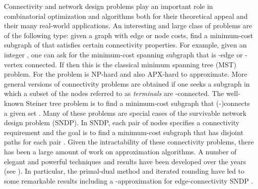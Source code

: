 \documentclass[11pt]{article}
\begin{document}
Connectivity and network design problems play an important role in
combinatorial optimization and algorithms both for their theoretical
appeal and their many real-world applications. An interesting and
large class of problems are of the following type: given a graph
 with edge or node costs, find a minimum-cost subgraph  of
 that satisfies certain connectivity properties. For example, given
an integer , one can ask for the minimum-cost spanning
subgraph that is -edge or -vertex connected. If
 then this is the classical minimum spanning tree (MST)
problem. For  the problem is NP-hard and also APX-hard to
approximate. More general versions of connectivity problems are
obtained if one seeks a subgraph in which a subset of the nodes  referred to as {\em terminals} are -connected.
The well-known Steiner tree problem is to find a minimum-cost subgraph
that (-)connects a given set . Many of these problems are
special cases of the survivable network design problem (SNDP). In
SNDP, each pair of nodes  specifies a connectivity
requirement  and the goal is to find a minimum-cost subgraph
that has  disjoint paths for each pair . Given the
intractability of these connectivity problems, there has been a large
amount of work on approximation algorithms. A number of elegant and
powerful techniques and results have been developed over the years
(see \cite{Hochbaum96,Vazirani01}). In particular, the primal-dual
method \cite{AgrawalKR95,GoemansW96} and iterated rounding \cite{Jain}
have led to some remarkable results including a -approximation for
edge-connectivity SNDP \cite{Jain}.
\end{document}
